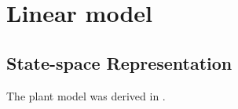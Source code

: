 \documentclass[crop=false,float=true,class=scrreprt]{standalone}
\begin{document}
\section{Linear model}
\subsection{State-space Representation}

The plant model was derived in 
\cite{REF:thesis:masters:2012-peltier}.



\clearpage
\end{document}
